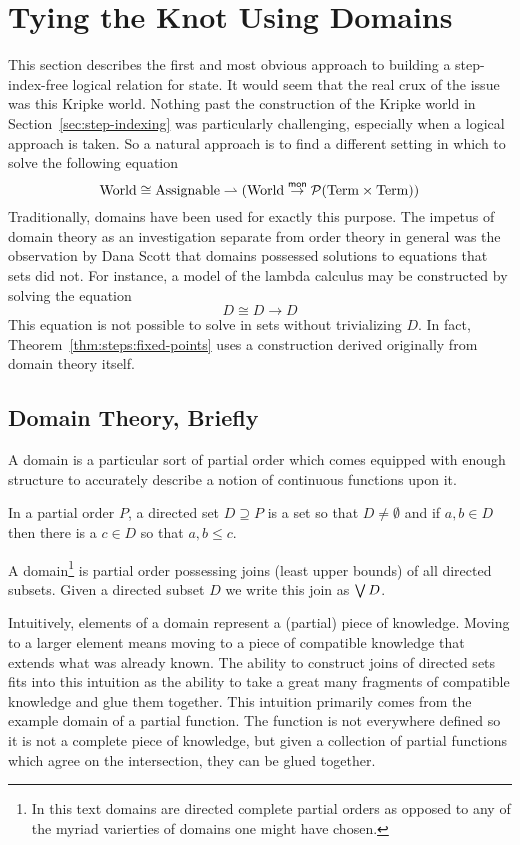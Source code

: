 \section{Tying the Knot Using Domains}\label{sec:domains}

This section describes the first and most obvious approach to building
a step-index-free logical relation for state. It would seem that the
real crux of the issue was this Kripke world. Nothing past the
construction of the Kripke world in Section~\ref{sec:step-indexing}
was particularly challenging, especially when a logical approach is
taken. So a natural approach is to find a different setting in which
to solve the following equation
\[
  \mathrm{World} \cong \mathrm{Assignable} \rightharpoonup (\mathrm{World} \overset{\mathsf{mon}}{\to} \mathcal{P}(\mathrm{Term} \times \mathrm{Term}))
\]
Traditionally, domains have been used for exactly this purpose. The
impetus of domain theory as an investigation separate from order
theory in general was the observation by Dana Scott that domains
possessed solutions to equations that sets did not. For instance, a
model of the lambda calculus may be constructed by solving the
equation
\[
  D \cong D \to D
\]
This equation is not possible to solve in sets without trivializing
$D$. In fact, Theorem~\ref{thm:steps:fixed-points} uses a construction
derived originally from domain theory itself.

\subsection{Domain Theory, Briefly}

A domain is a particular sort of partial order which comes equipped
with enough structure to accurately describe a notion of continuous
functions upon it.
\begin{defn}\label{def:domains:directed-set}
  In a partial order $P$, a directed set $D \supseteq P$ is a set so
  that $D \neq \emptyset$ and if $a, b \in D$ then there is a $c \in
  D$ so that $a, b \le c$.
\end{defn}
\begin{defn}\label{def:domains:domain}
  A domain\footnote{In this text domains are directed complete partial
    orders as opposed to any of the myriad varierties of domains one
    might have chosen.} is partial order possessing joins (least upper
  bounds) of all directed subsets. Given a directed subset $D$ we
  write this join as $\bigvee D$.
\end{defn}
Intuitively, elements of a domain represent a (partial) piece of
knowledge. Moving to a larger element means moving to a piece of
compatible knowledge that extends what was already known. The ability
to construct joins of directed sets fits into this intuition as the
ability to take a great many fragments of compatible knowledge and
glue them together. This intuition primarily comes from the example
domain of a partial function. The function is not everywhere defined
so it is not a complete piece of knowledge, but given a collection of
partial functions which agree on the intersection, they can be glued
together.

